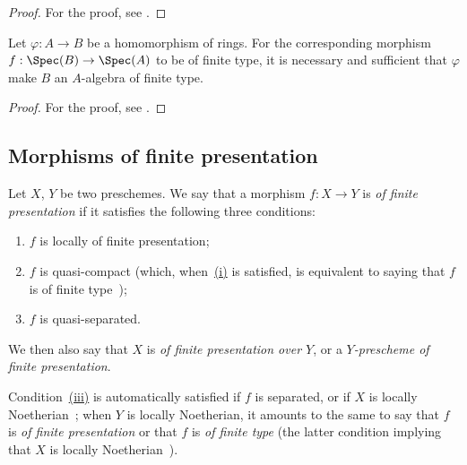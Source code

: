\begin{proof}
For the proof, see .
\end{proof}

\begin{proposition}[1.5.7]
\label{IV.1.5.7}
Let $\varphi:A\to B$ be a homomorphism of rings.
For the corresponding morphism $f:\Spec(B)\to\Spec(A)$ to be of finite type, it is necessary and sufficient that $\varphi$ make $B$ an $A$-algebra of finite type.
\end{proposition}

\begin{proof}
For the proof, see .
\end{proof}

\subsection{Morphisms of finite presentation}
\label{subsection:IV.1.6}

\begin{definition}[1.6.1]
\label{IV.1.6.1}
Let $X$, $Y$ be two preschemes.
We say that a morphism $f:X\to Y$ is \emph{of finite presentation} if it satisfies the following three conditions:
\begin{enumerate}
  \item[\rm(i)] $f$ is locally of finite presentation;
  \item[\rm(ii)] $f$ is quasi-compact (which, when~{\hyperlink{ega4.c04.def.1-6-1}{(i)}} is satisfied, is equivalent to saying that $f$ is of finite type~);
  \item[\rm(iii)] $f$ is quasi-separated.
\end{enumerate}
We then also say that $X$ is \emph{of finite presentation over $Y$}, or a \emph{$Y$-prescheme of finite presentation}.
\end{definition}

Condition~{\hyperlink{ega4.c04.def.1-6-1}{(iii)}} is automatically satisfied if $f$ is separated, or if $X$ is locally Noetherian~; when $Y$ is locally Noetherian, it amounts to the same to say that $f$ is \emph{of finite presentation} or that $f$ is \emph{of finite type} (the latter condition implying that $X$ is locally Noetherian~).

